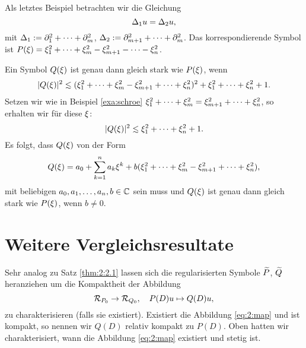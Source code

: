 \begin{exa}\label{exa:hyper}
Als letztes Beispiel betrachten wir die Gleichung
\begin{equation}
\Delta_1u=\Delta_2u,
\end{equation}
mit $\Delta_1:=\partial_1^2+\dots+\partial_m^2$, $\Delta_2:=\partial^2_{m+1}+\dots+\partial^2_m$.
Das korrespondierende Symbol ist $P(\xi)=\xi^2_1+\dots+\xi^2_m-\xi^2_{m+1}-\dots-\xi^2_n$.

Ein Symbol $Q(\xi)$ ist genau dann gleich stark wie $P(\xi)$,
wenn
\begin{equation}
\abs{Q(\x)}^2\apprle(\x^2_1+\dots+\x^2_m-\x^2_{m+1}+\dots+\x^2_n)^2+\x^2_1+\dots+\x^2_n+1.
\end{equation}
Setzen wir wie in Beispiel \ref{exa:schroe} $\xi^2_1+\dots+\xi^2_m=\xi^2_{m+1}+\dots+\xi^2_n$,
so erhalten wir für diese $\xi$:
\begin{equation}
\abs{Q(\x)}^2\apprle\x^2_1+\dots+\x^2_n+1.
\end{equation}
Es folgt, dass $Q(\xi)$ von der Form
\begin{equation}
Q(\xi)=a_0+\sum_{k=1}^na_k\xi^k+b(\xi_1^2+\dots+\xi^2_m-\xi^2_{m+1}+\dots+\xi^2_n),
\end{equation}
mit beliebigen $a_0,a_1,\dots,a_n,b\in\mathbb C$ sein muss
und $Q(\xi)$ ist genau dann gleich stark wie $P(\xi)$,
wenn $b\neq0$.
\end{exa}

\section{Weitere Vergleichsresultate}

Sehr analog zu Satz \ref{thm:2:2.1} lassen sich die regularisierten
Symbole $\widetilde{P}$, $\widetilde{Q}$ heranziehen
um die Kompaktheit der Abbildung
\begin{equation}\label{eq:2:map}
\mathcal R_{P_0}\to\mathcal R_{Q_0},\quad P(D)u\mapsto Q(D)u,
\end{equation}
zu charakterisieren (falls sie existiert).
Existiert die Abbildung \eqref{eq:2:map} und ist kompakt,
so nennen wir $Q(D)$ relativ kompakt zu $P(D)$.
Oben hatten wir charakterisiert,
wann die Abbildung \eqref{eq:2:map} existiert und stetig ist.

